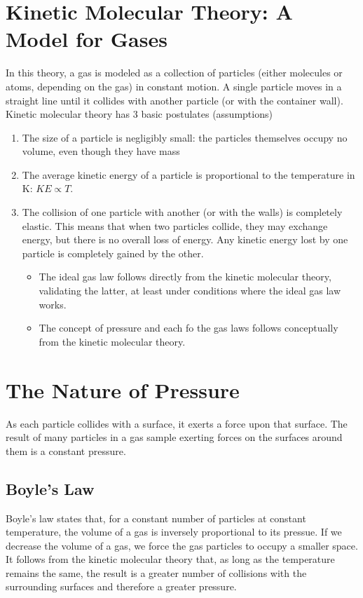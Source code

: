 \documentclass[
	chapter=5,
	title={Gases},
	showanswers=true,
]{chem122notes}
\begin{document}
\section{Kinetic Molecular Theory: A Model for Gases}\label{sec:kinetic-molecular-theory}
In this theory, a gas is modeled as a collection of particles (either molecules or atoms, depending on the gas) in constant motion.
A single particle moves in a straight line until it collides with another particle (or with the container wall).
Kinetic molecular theory has 3 basic postulates (assumptions)
\begin{enumerate}
	\item\label{pos:kmt-1} The size of a particle is negligibly small: the particles themselves occupy no volume, even though they have mass
	\item\label{pos:kmt-2} The average kinetic energy of a particle is proportional to the temperature in K: $KE \propto T$.
	\item\label{pos:kmt-3} The collision of one particle with another (or with the walls) is completely elastic.
	This means that when two particles collide, they may exchange energy, but there is no overall loss of energy.
	Any kinetic energy lost by one particle is completely gained by the other.
	\begin{itemize}
		\item The ideal gas law follows directly from the kinetic molecular theory, validating the latter, at least under conditions where the ideal gas law works.
		\item The concept of pressure and each fo the gas laws follows conceptually from the kinetic molecular theory.
	\end{itemize}
\end{enumerate}

\section{The Nature of Pressure}\label{sec:the-nature-of-pressure}
As each particle collides with a surface, it exerts a force upon that surface.
The result of many particles in a gas sample exerting forces on the surfaces around them is a constant pressure.

\subsection{Boyle's Law}\label{subsec:nature-of-pressure-boyles-law}
Boyle's law states that, for a constant number of particles at constant temperature, the volume of a gas is inversely proportional to its pressue.
If we decrease the volume of a gas, we force the gas particles to occupy a smaller space.
It follows from the kinetic molecular theory that, as long as the temperature remains the same, the result is a greater number of collisions with the surrounding surfaces and therefore a greater pressure.
\end{document}
